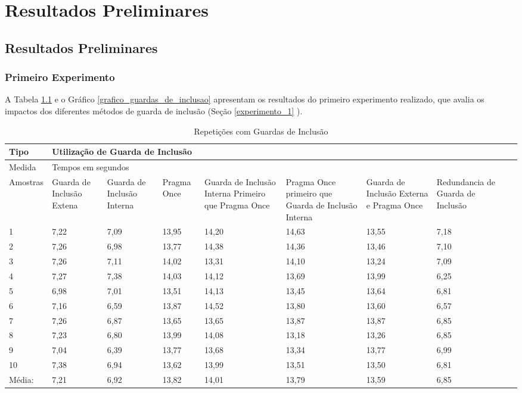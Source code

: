 \part{Resultados Preliminares}

\chapter[Resultados Preliminares]{Resultados Preliminares}


\section{Primeiro Experimento}

A Tabela \ref{tab:tabela_guarda_de_inclusao} e o Gráfico 
\ref{grafico_guardas_de_inclusao} apresentam os resultados
 do primeiro experimento realizado, que avalia os impactos
 dos diferentes métodos de guarda de inclusão (Seção \ref{experimento_1} ).



\begin{table}[h]
\centering
\begin{tabular}{|l|p{1.5cm}|p{1.5cm}|p{1.5cm}|p{1.5cm}|p{2cm}|p{2cm}|p{2cm}|p{2cm}|}
\hline
Tipo & \multicolumn{7}{l|}{Utilização de Guarda de Inclusão} \\ \hline
Medida & \multicolumn{7}{l|}{Tempos em segundos } \\ \hline
Amostras & Guarda de Inclusão Extena & Guarda de Inclusão Interna & Pragma Once & Guarda de Inclusão Interna Primeiro que Pragma Once & Pragma Once primeiro que Guarda de Inclusão Interna & Guarda de Inclusão Externa e Pragma Once & Redundancia de Guarda de Inclusão \\ \hline
 1  & 7,22 & 7,09 & 13,95  &  14,20 &14,63   &  13,55 &  7,18  \\ \hline
 2  & 7,26 & 6,98 & 13,77  &  14,38 & 14,36  &  13,46 & 7,10   \\ \hline
 3  & 7,26 & 7,11 & 14,02  &  13,31 & 14,10  &  13,24 &7,09    \\ \hline
 4  & 7,27 & 7,38 & 14,03  &  14,12 & 13,69  &  13,99 &6,25    \\ \hline
 5  & 6,98 & 7,01 & 13,51  &  14,13 & 13,45  &  13,64 &6,81    \\ \hline
 6  & 7,16 & 6,59 & 13,87  &  14,52 & 13,80  &  13,60 &6,57    \\ \hline
 7  & 7,26 & 6,87 & 13,65  &  13,65 & 13,87  &  13,87 &6,85    \\ \hline 
 8  & 7,23 & 6,80 & 13,99  &  14,08 & 13,18  &  13,26 &6,85    \\ \hline
 9  & 7,04 & 6,39 & 13,77  &  13,68 & 13,34  &  13,77 &6,99    \\ \hline
 10 & 7,38 & 6,94 & 13,62  &  13,99 & 13,51  &  13,50 &6,81    \\ \hline
 Média: & 7,21 & 6,92 & 13,82& 14,01& 13,79  &  13,59 &6,85    \\ \hline
\end{tabular}
\caption{Repetições com Guardas de Inclusão}
\label{tab:tabela_guarda_de_inclusao}
\end{table}

